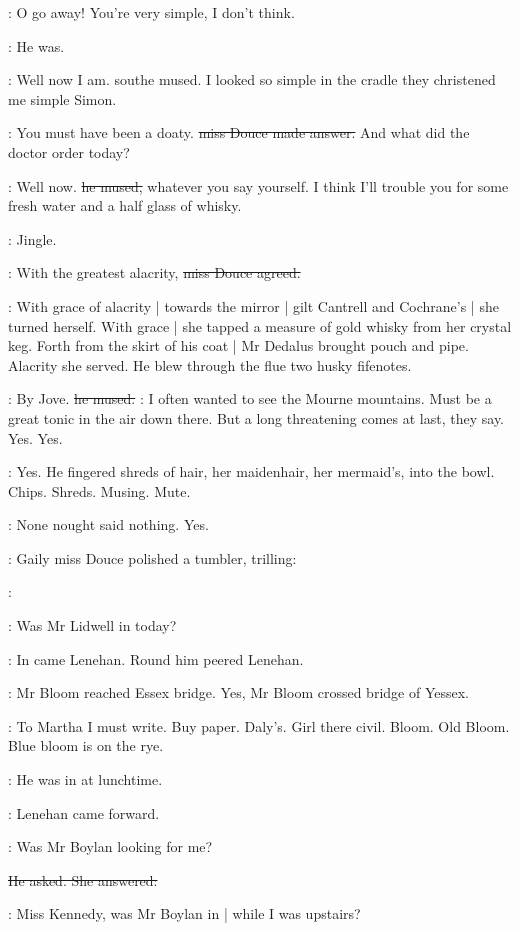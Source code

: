 \MissD:
O go away!
You're very simple,
I don't think.

:
He was.

\simon:
Well now I am.
sout{he mused.}
I looked so simple in the cradle they christened
me simple Simon.

\MissD:
You must have been a doaty.
\sout{miss Douce made answer.}
And what did the doctor order today?

\simon:
Well now.
\sout{he mused,}
whatever you say yourself.
I think I'll trouble you
for some fresh water
and a half glass of whisky.

:
Jingle.

\MissD:
With the greatest alacrity,
\sout{miss Douce agreed.}

:
With grace of alacrity |
towards the mirror |
gilt Cantrell and Cochrane's |
she turned herself.
With grace |
she tapped a measure of gold whisky from her crystal keg.
Forth from the skirt of his coat |
Mr Dedalus brought pouch and pipe.
Alacrity she served.
He blew through the flue two husky fifenotes.

\simon:
By Jove.
\sout{he mused.}
\simon:
I often wanted to see the Mourne mountains.
Must be a great tonic in the air down there.
But a long threatening comes at last,
they say.
Yes.
Yes.

:
Yes.
He fingered shreds of hair,
her maidenhair,
her mermaid's,
into the bowl.
Chips.
Shreds.
Musing.
Mute.

\BloomInt:
None nought said nothing.
Yes.

:
Gaily miss Douce polished a tumbler,
trilling:

\MissD:

\lenehan:
Was Mr Lidwell in today?

:
In came Lenehan.
Round him peered Lenehan.

:
Mr Bloom reached Essex bridge.
Yes,
Mr Bloom crossed bridge of Yessex.

\BloomInt:
To Martha I must write.
Buy paper.
Daly's.
Girl there civil.
Bloom.
Old Bloom.
Blue bloom is on the rye.

\MissD:
He was in at lunchtime.

:
Lenehan came forward.

\lenehan:
Was Mr Boylan looking for me?

\sout{He asked.
She answered:}

\MissD:
Miss Kennedy,
was Mr Boylan in |
while I was upstairs?

